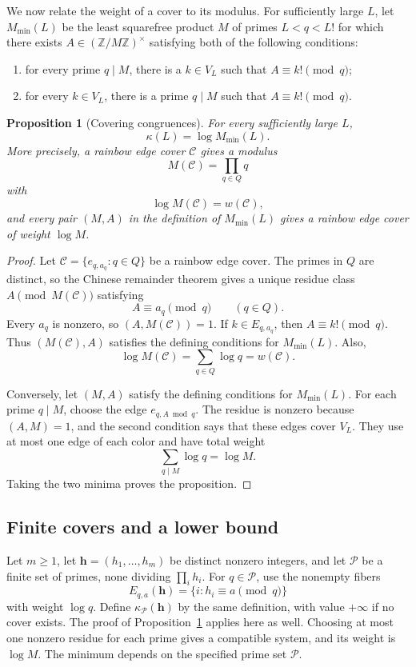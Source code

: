 \documentclass[11pt]{amsart}
\newtheorem{proposition}[theorem]{Proposition}
\theoremstyle{definition}
\theoremstyle{remark}
\begin{document}
We now relate the weight of a cover to its modulus. For
sufficiently large $L$, let $M_{\min}(L)$ be the least squarefree product
$M$ of primes $L<q<L!$ for which there exists
$A\in(\mathbb Z/M\mathbb Z)^\times$ satisfying both of the following
conditions:
\begin{enumerate}
\item for every prime $q\mid M$, there is a $k\in V_L$ such that
$A\equiv k!\pmod q$;
\item for every $k\in V_L$, there is a prime $q\mid M$ such that
$A\equiv k!\pmod q$.
\end{enumerate}

\begin{proposition}[Covering congruences]
\label{prop:crt-equivalence}
For every sufficiently large $L$,
\[
\kappa(L)=\log M_{\min}(L).
\]
More precisely, a rainbow edge cover $\mathcal C$ gives a modulus
\[
M(\mathcal C)=\prod_{q\in Q}q
\]
with
\[
\log M(\mathcal C)=w(\mathcal C),
\]
and every pair $(M,A)$ in the definition of $M_{\min}(L)$ gives a rainbow
edge cover of weight $\log M$.
\end{proposition}

\begin{proof}
Let $\mathcal C=\{e_{q,a_q}:q\in Q\}$ be a rainbow edge cover.  The primes
in $Q$ are distinct, so the Chinese remainder theorem gives a unique residue class
$A\pmod {M(\mathcal C)}$ satisfying
\[
A\equiv a_q\pmod q\qquad(q\in Q).
\]
Every $a_q$ is nonzero, so $(A,M(\mathcal C))=1$.  If $k\in E_{q,a_q}$,
then $A\equiv k!\pmod q$.  Thus $(M(\mathcal C),A)$ satisfies the defining
conditions for $M_{\min}(L)$.  Also,
\[
\log M(\mathcal C)=\sum_{q\in Q}\log q
=w(\mathcal C).
\]

Conversely, let $(M,A)$ satisfy the defining conditions for $M_{\min}(L)$.
For each prime $q\mid M$, choose the edge $e_{q,A\bmod q}$.  The residue is
nonzero because $(A,M)=1$, and the second condition says that these edges
cover $V_L$.  They use at most one edge of each color and have total weight
\[
\sum_{q\mid M}\log q=\log M.
\]
Taking the two minima proves the proposition.
\end{proof}

\subsection{Finite covers and a lower bound}
Let $m\geq1$, let $\mathbf h=(h_1,\ldots,h_m)$ be distinct nonzero
integers, and let
$\mathcal P$ be a finite set of primes, none dividing $\prod_i h_i$.
For $q\in\mathcal P$, use the nonempty fibers
\[
E_{q,a}(\mathbf h)=\{i:h_i\equiv a\pmod q\}
\]
with weight $\log q$. Define $\kappa_{\mathcal P}(\mathbf h)$ by the same
definition, with value $+\infty$ if no cover exists.
The proof of Proposition~\ref{prop:crt-equivalence} applies here as
well. Choosing at most one nonzero residue for each prime gives a
compatible system, and its weight is $\log M$. The minimum depends on
the specified prime set $\mathcal P$.
\end{document}

